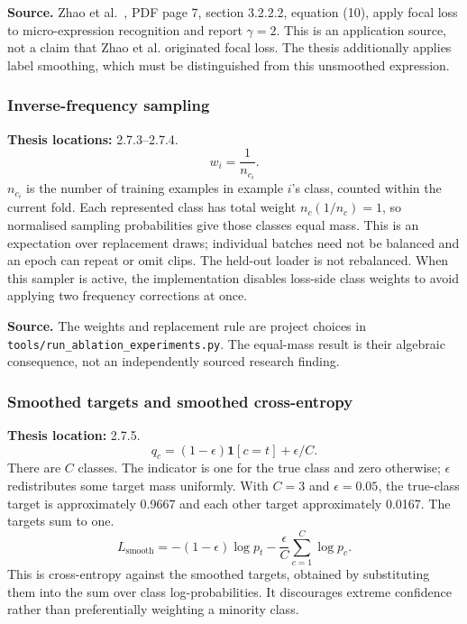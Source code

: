 \documentclass[11pt,a4paper]{article}
\numberwithin{equation}{section}
\begin{document}
\textbf{Source.} Zhao et al.~\cite{zhaoS2021}, PDF page 7, section 3.2.2.2,
equation (10), apply focal loss to micro-expression recognition and report
$\gamma=2$. This is an application source, not a claim that Zhao et al.
originated focal loss. The thesis additionally applies label smoothing,
which must be distinguished from this unsmoothed expression.

\subsubsection{Inverse-frequency sampling}
\label{fg:sampling}
\textbf{Thesis locations:} 2.7.3--2.7.4.
\begin{equation}
    w_i=\frac1{n_{c_i}}.
    \label{fg:eq:sampling}
\end{equation}
$n_{c_i}$ is the number of training examples in example $i$'s class, counted
within the current fold. Each represented class has total weight
$n_c(1/n_c)=1$, so normalised sampling probabilities give those classes
equal mass. This is an expectation over replacement draws; individual
batches need not be balanced and an epoch can repeat or omit clips.
The held-out loader is not rebalanced. When this sampler is active, the
implementation disables loss-side class weights to avoid applying two
frequency corrections at once.

\textbf{Source.} The weights and replacement rule are project choices in
\texttt{tools/run\_ablation\_experiments.py}. The equal-mass result is their
algebraic consequence, not an independently sourced research finding.

\subsubsection{Smoothed targets and smoothed cross-entropy}
\label{fg:smoothing}
\textbf{Thesis location:} 2.7.5.
\begin{equation}
    q_c=(1-\epsilon)\mathbf{1}[c=t]+\epsilon/C.
    \label{fg:eq:smoothing-target}
\end{equation}
There are $C$ classes. The indicator is one for the true class and zero
otherwise; $\epsilon$ redistributes some target mass uniformly. With
$C=3$ and $\epsilon=0.05$, the true-class target is approximately 0.9667 and
each other target approximately 0.0167. The targets sum to one.
\begin{equation}
    L_{\mathrm{smooth}}
      =-(1-\epsilon)\log p_t
        -\frac{\epsilon}{C}\sum_{c=1}^{C}\log p_c.
    \label{fg:eq:smoothing-loss}
\end{equation}
This is cross-entropy against the smoothed targets, obtained by substituting
them into the sum over class log-probabilities. It discourages extreme
confidence rather than preferentially weighting a minority class.
\end{document}

